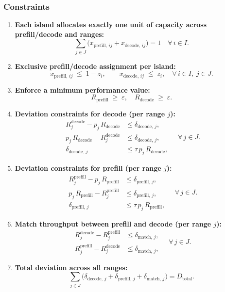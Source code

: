 \subsubsection*{Constraints}
\begin{enumerate}
  \item \textbf{Each island allocates exactly one unit of capacity across prefill/decode and ranges:}
  \[
    \sum_{j\in J}\bigl(x_{\mathrm{prefill},\,i j} + x_{\mathrm{decode},\,i j}\bigr) = 1
    \quad\forall\,i\in I.
  \]

  \item \textbf{Exclusive prefill/decode assignment per island:}
  \[
    x_{\mathrm{prefill},\,i j} \;\le\; 1 - z_i,
    \qquad
    x_{\mathrm{decode},\,i j} \;\le\; z_i,
    \quad
    \forall\,i\in I,\;j\in J.
  \]

  \item \textbf{Enforce a minimum performance value:}
  \[
    R_{\mathrm{prefill}} \;\ge\; \varepsilon,
    \quad
    R_{\mathrm{decode}} \;\ge\; \varepsilon.
  \]

  \item \textbf{Deviation constraints for decode (per range \(j\)):}
  \[
  \begin{aligned}
    R_{j}^{\mathrm{decode}} - p_j\,R_{\mathrm{decode}} &\le \delta_{\mathrm{decode},\,j},\\
    p_j\,R_{\mathrm{decode}} - R_{j}^{\mathrm{decode}} &\le \delta_{\mathrm{decode},\,j},\\
    \delta_{\mathrm{decode},\,j} &\le \tau\,p_j\,R_{\mathrm{decode}},
  \end{aligned}
  \quad
  \forall\,j\in J.
  \]

  \item \textbf{Deviation constraints for prefill (per range \(j\)):}
  \[
  \begin{aligned}
    R_{j}^{\mathrm{prefill}} - p_j\,R_{\mathrm{prefill}} &\le \delta_{\mathrm{prefill},\,j},\\
    p_j\,R_{\mathrm{prefill}} - R_{j}^{\mathrm{prefill}} &\le \delta_{\mathrm{prefill},\,j},\\
    \delta_{\mathrm{prefill},\,j} &\le \tau\,p_j\,R_{\mathrm{prefill}},
  \end{aligned}
  \quad
  \forall\,j\in J.
  \]

  \item \textbf{Match throughput between prefill and decode (per range \(j\)):}
  \[
  \begin{aligned}
    R_{j}^{\mathrm{decode}} - R_{j}^{\mathrm{prefill}} &\le \delta_{\mathrm{match},\,j},\\
    R_{j}^{\mathrm{prefill}} - R_{j}^{\mathrm{decode}} &\le \delta_{\mathrm{match},\,j},
  \end{aligned}
  \quad
  \forall\,j\in J.
  \]

  \item \textbf{Total deviation across all ranges:}
  \[
    \sum_{j\in J} \bigl(\delta_{\mathrm{decode},\,j} + \delta_{\mathrm{prefill},\,j} + \delta_{\mathrm{match},\,j}\bigr)
    = D_{\mathrm{total}}.
  \]
\end{enumerate}

